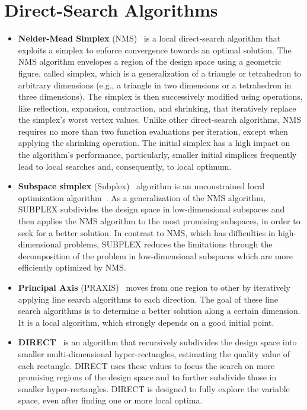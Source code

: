 \section{Direct-Search Algorithms}
\begin{itemize}
	\item \textbf{Nelder-Mead Simplex} (NMS)~\cite{Nelder1964} is a local direct-search algorithm that exploits a simplex to enforce convergence towards an optimal solution. The NMS algorithm envelopes a region of the design space using a geometric figure, called simplex, which is a generalization of a triangle or tetrahedron to arbitrary dimensions (e.g., a triangle in two dimensions or a tetrahedron in three dimensions). The simplex is then successively modified using operations, like reflection, expansion, contraction, and shrinking, that iteratively replace the simplex's worst vertex values. Unlike other direct-search algorithms, NMS requires no more than two function evaluations per iteration, except when applying the shrinking operation. The initial simplex has a high impact on the algorithm's performance, particularly, smaller initial simplices frequently lead to local searches and, consequently, to local optimum.
	
	\item \textbf{Subspace simplex} (Subplex)~\cite{Rowan1990} algorithm is an unconstrained local optimization algorithm~\cite{Rowan1990}. As a generalization of the NMS algorithm, SUBPLEX subdivides the design space in low-dimensional subspaces and then applies the NMS algorithm to the most promising subspaces, in order to seek for a better solution. In contrast to NMS, which has difficulties in high-dimensional problems, SUBPLEX reduces the limitations through the decomposition of the problem in low-dimensional subspaces which are more efficiently optimized by NMS.
	
	\item \textbf{Principal Axis} (PRAXIS)~\cite{Brent1973} moves from one region to other by iteratively applying line search algorithms to each direction. The goal of these line search algorithms is to determine a better solution along a certain dimension. It is a local algorithm, which strongly depends on a good initial point.
	
	\item \textbf{DIRECT}~\cite{Jones1993DIRECT} is an algorithm that recursively subdivides the design space into smaller multi-dimensional hyper-rectangles, estimating the quality value of each rectangle. DIRECT uses these values to focus the search on more promising regions of the design space and to further subdivide those in smaller hyper-rectangles. DIRECT is designed to fully explore the variable space, even after finding one or more local optima.
	

\end{itemize}

